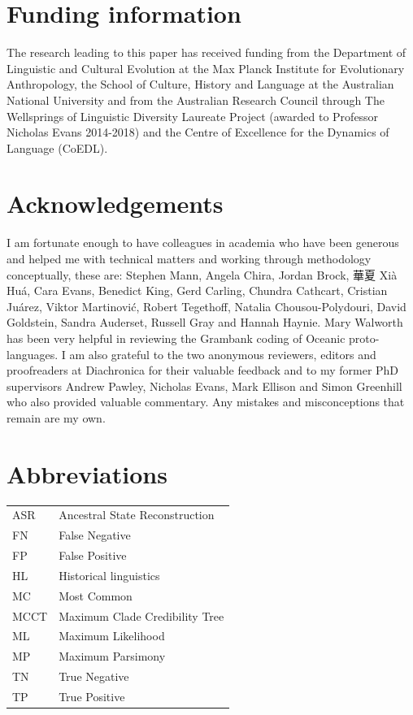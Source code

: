 \documentclass[12pt,letterpaper]{article}
\begin{document}
\FloatBarrier

\section*{Funding information}
The research leading to this paper has received funding from the Department of Linguistic and Cultural Evolution at the Max Planck Institute for Evolutionary Anthropology, the School of Culture, History and Language at the Australian National University and from the Australian Research Council through The Wellsprings of Linguistic Diversity Laureate Project (awarded to Professor Nicholas Evans 2014-2018) and the Centre of Excellence for the Dynamics of Language (CoEDL).

\section*{Acknowledgements}
I am fortunate enough to have colleagues in academia who have been generous and helped me with technical matters and working through methodology conceptually, these are: Stephen Mann, Angela Chira, Jordan Brock, 華夏 Xià Huá, Cara Evans, Benedict King, Gerd Carling, Chundra Cathcart, Cristian Juárez, Viktor Martinović, Robert Tegethoff, Natalia Chousou-Polydouri, David Goldstein, Sandra Auderset, Russell Gray and Hannah Haynie. Mary Walworth has been very helpful in reviewing the Grambank coding of Oceanic proto-languages. I am also grateful to the two anonymous reviewers, editors and proofreaders at Diachronica for their valuable feedback and to my former PhD supervisors Andrew Pawley, Nicholas Evans, Mark Ellison and Simon Greenhill who also provided valuable commentary. Any mistakes and misconceptions that remain are my own.



\section*{Abbreviations}
\begin{tabular}{p{3cm} p{10cm} }
ASR & Ancestral State Reconstruction\\
FN & False Negative \\
FP & False Positive \\
HL & Historical linguistics\\
MC & Most Common \\
MCCT & Maximum Clade Credibility Tree \\
ML & Maximum Likelihood \\
MP &Maximum Parsimony \\
TN & True Negative\\
TP & True Positive \\
\end{tabular}
\end{document}

